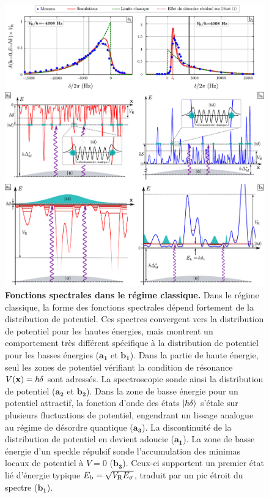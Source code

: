 \begin{figure}
\centering
\includegraphics[width=\textwidth]{Fig/TauS_NJP/fonctions_spectrales_classiques.pdf}
\caption{\textbf{Fonctions spectrales dans le régime classique.} Dans le régime classique, la forme des fonctions spectrales dépend fortement de la distribution de potentiel. Ces spectres convergent vers la distribution de potentiel pour les hautes énergies, mais montrent un comportement très différent spécifique à la distribution de potentiel pour les basses énergies ($\mathbf{a_1}$ et $\mathbf{b_1}$). Dans la partie de haute énergie, seul les zones de potentiel vérifiant la condition de résonance $V(\mathbf{x})=\hslash\delta$ sont adressés. La spectroscopie sonde ainsi la distribution de potentiel ($\mathbf{a_2}$ et $\mathbf{b_2}$). Dans la zone de basse énergie pour un potentiel attractif, la fonction d'onde des états $\left| \hslash\delta \right\rangle$ s'étale sur plusieurs fluctuations de potentiel, engendrant un lissage analogue au régime de désordre quantique ($\mathbf{a_3}$). La discontinuité de la distribution de potentiel en devient adoucie ($\mathbf{a_1}$). La zone de basse énergie d'un speckle répulsif sonde l'accumulation des minimas locaux de potentiel à $V=0$ ($\mathbf{b_3}$). Ceux-ci supportent un premier état lié d'énergie typique $E_{\mathrm{b}}=\sqrt{V_{\mathrm{R}}E_{\sigma}}$, traduit par un pic étroit du spectre ($\mathbf{b_1}$).}
\label{fig:fonctions_spectrales_classiques}
\end{figure}

